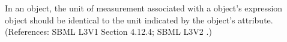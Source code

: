 In an \Event object, the unit of measurement associated with a \Delay
object's  expression object should be identical to the unit
indicated by the \Model object's  attribute.  (References:
SBML L3V1 Section 4.12.4; SBML L3V2 .)
